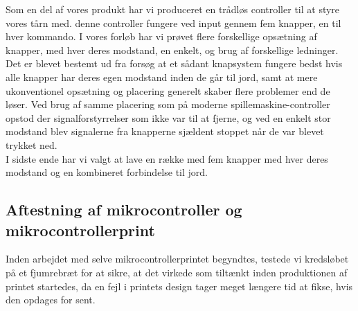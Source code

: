Som en del af vores produkt har vi produceret en trådløs controller til at styre vores tårn med. denne controller fungere ved input gennem fem knapper, en til hver kommando. I vores forløb har vi prøvet flere forskellige opsætning af knapper, med hver deres modstand, en enkelt, og brug af forskellige ledninger. Det er blevet bestemt ud fra forsøg at et sådant knapsystem fungere bedst hvis alle knapper har deres egen modstand inden de går til jord, samt at mere ukonventionel opsætning og placering generelt skaber flere problemer end de løser. Ved brug af samme placering som på moderne spillemaskine-controller opstod der signalforstyrrelser som ikke var til at fjerne, og ved en enkelt stor modstand blev signalerne fra knapperne sjældent stoppet når de var blevet trykket ned.\\

I sidste ende har vi valgt at lave en række med fem knapper med hver deres modstand og en kombineret forbindelse til jord.

\subsection{Aftestning af mikrocontroller og mikrocontrollerprint}
Inden arbejdet med selve mikrocontrollerprintet begyndtes, testede vi kredsløbet på et fjumrebræt for at sikre, at det virkede som tiltænkt inden produktionen af printet startedes, da en fejl i printets design tager meget længere tid at fikse, hvis den opdages for sent.

